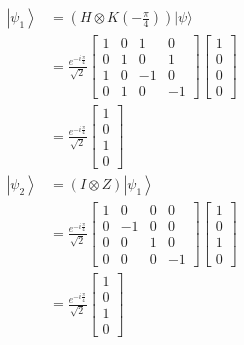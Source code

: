 \documentclass[main.tex]{subfiles}
\begin{document}
\begin{enumerate}
\begin{enumerate}
    \begin{align*}
        \left|\psi_{1}\right\rangle & = \left(H \otimes K\left(-\frac{\pi}{4}\right)\right)|\psi\rangle\\
                                    & = \frac{e^{-i \frac{\pi}{4}}}{\sqrt{2}}\left[\begin{array}{llll}
                                    1 & 0 & 1 & 0 \\
                                    0 & 1 & 0 & 1 \\
                                    1 & 0 & -1 & 0 \\
                                    0 & 1 & 0 & -1\end{array}\right]
                                    \left[\begin{array}{l}1\\0\\0\\0\end{array}\right]\\
                                    & = \frac{e^{-i \frac{\pi}{4}}}{\sqrt{2}}
                                    \left[\begin{array}{l}1\\0\\1\\0\end{array}\right]\\ 
        \left|\psi_{2}\right\rangle & = (I \otimes Z)\left|\psi_{1}\right\rangle\\
                                    & = \frac{e^{-i \frac{\pi}{4}}}{\sqrt{2}}
                                    \left[\begin{array}{llll}1 & 0 & 0 & 0 \\ 
                                    0 & -1 & 0 & 0 \\
                                    0 & 0 & 1 & 0 \\
                                    0 & 0 & 0 & -1\end{array}\right]
                                    \left[\begin{array}{l}1\\0\\1\\0\end{array}\right]\\ 
                                    & = \frac{e^{-i \frac{\pi}{4}}}{\sqrt{2}}
                                    \left[\begin{array}{l}1\\0\\1\\0\end{array}\right]\\ 

\end{align*}
\end{enumerate}
\end{enumerate}
\end{document}
